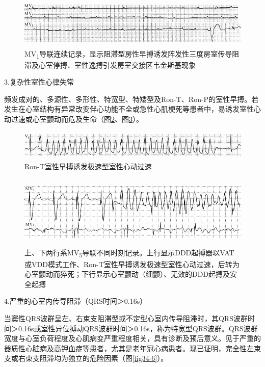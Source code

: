 \begin{figure}[!htbp]
 \centering
 \includegraphics[width=5.58333in,height=0.95833in]{./images/Image00543.jpg}
 \captionsetup{justification=centering}
 \caption{MV\textsubscript{1}导联连续记录，显示阻滞型房性早搏诱发阵发性三度房室传导阻滞及心室停搏、室性逸搏引发房室交接区韦金斯基现象}
 \label{fig34-3}
  \end{figure} 


3.复杂性室性心律失常

频发成对的、多源性、多形性、特宽型、特矮型及Ron-T、Ron-P的室性早搏。若发生在心室结构有异常改变伴心功能不全或急性心肌梗死等患者中，易诱发室性心动过速或心室颤动而危及生命（图\ref{fig34-4}、图\ref{fig34-5}）。

\begin{figure}[!htbp]
 \centering
 \includegraphics[width=5.58333in,height=0.57292in]{./images/Image00544.jpg}
 \captionsetup{justification=centering}
 \caption{Ron-T室性早搏诱发极速型室性心动过速}
 \label{fig34-4}
  \end{figure} 

\begin{figure}[!htbp]
 \centering
 \includegraphics[width=5.58333in,height=1.36458in]{./images/Image00545.jpg}
 \captionsetup{justification=centering}
 \caption{上、下两行系MV\textsubscript{5}导联不同时刻记录。上行显示DDD起搏器以VAT或VDD模式工作、Ron-T室性早搏诱发极速型室性心动过速，后转为心室颤动而猝死；下行显示心室颤动（细颤）、无效的DDD起搏及安全起搏}
 \label{fig34-5}
  \end{figure} 


4.严重的心室内传导阻滞（QRS时间＞0.16s）

当窦性QRS波群呈左、右束支阻滞型或不定型心室内传导阻滞时，其QRS波群时间＞0.16s或室性异位搏动QRS波群时间＞0.16s，称为特宽型QRS波群。QRS波群宽度与心室负荷程度及心肌病变严重程度相关，具有诊断及预后意义。见于严重的器质性心脏病及高钾血症等患者，尤其是老年冠心病患者。现已证明，完全性左束支或右束支阻滞均为独立的危险因素（图\ref{fig34-6}）。


